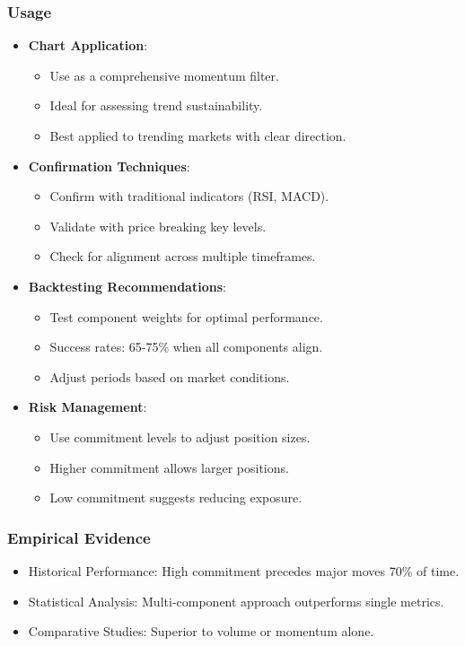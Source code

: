 \documentclass[12pt]{article}
\begin{document}
\subsubsection{Usage}
\begin{itemize}
\item \textbf{Chart Application}:
  \begin{itemize}
  \item Use as a comprehensive momentum filter.
  \item Ideal for assessing trend sustainability.
  \item Best applied to trending markets with clear direction.
  \end{itemize}
\item \textbf{Confirmation Techniques}:
  \begin{itemize}
  \item Confirm with traditional indicators (RSI, MACD).
  \item Validate with price breaking key levels.
  \item Check for alignment across multiple timeframes.
  \end{itemize}
\item \textbf{Backtesting Recommendations}:
  \begin{itemize}
  \item Test component weights for optimal performance.
  \item Success rates: 65-75\% when all components align.
  \item Adjust periods based on market conditions.
  \end{itemize}
\item \textbf{Risk Management}:
  \begin{itemize}
  \item Use commitment levels to adjust position sizes.
  \item Higher commitment allows larger positions.
  \item Low commitment suggests reducing exposure.
  \end{itemize}
\end{itemize}

\subsubsection{Empirical Evidence}
\begin{itemize}
\item Historical Performance: High commitment precedes major moves 70\% of time.
\item Statistical Analysis: Multi-component approach outperforms single metrics.
\item Comparative Studies: Superior to volume or momentum alone.
\end{itemize}
\end{document}
